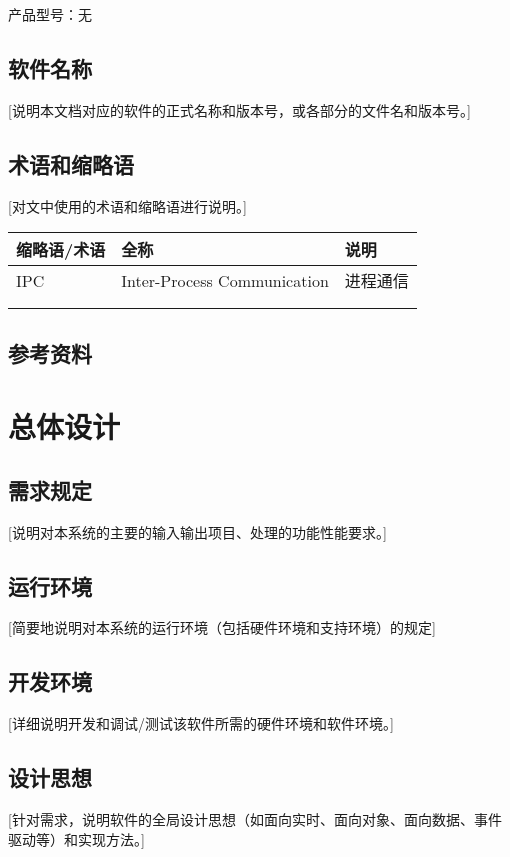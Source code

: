 \documentclass[10pt,a4paper,titlepage]{article} %
\begin{document}
产品型号：无

\subsection{软件名称}
[说明本文档对应的软件的正式名称和版本号，或各部分的文件名和版本号。]\newline
\subsection{术语和缩略语}
[对文中使用的术语和缩略语进行说明。] 
\begin{center}  
\begin{tabular}{|m{5cm}<{\centering}|m{5cm}<{\centering}|m{5cm}<{\centering}|}
\hline  
缩略语/术语 & 全称 & 说明 \\  \hline  
 IPC & Inter-Process Communication & 进程通信  \\ \hline
  &  &   \\ \hline
  &  &   \\ \hline
\end{tabular}  
\end{center}  
 
\subsection{参考资料}
\section{总体设计}
\subsection{需求规定}
[说明对本系统的主要的输入输出项目、处理的功能性能要求。]\newline
\subsection{运行环境}
[简要地说明对本系统的运行环境（包括硬件环境和支持环境）的规定]\newline
\subsection{开发环境}
[详细说明开发和调试/测试该软件所需的硬件环境和软件环境。]\newline
\subsection{设计思想}
[针对需求，说明软件的全局设计思想（如面向实时、面向对象、面向数据、事件驱动等）和实现方法。]\newline
\end{document}
